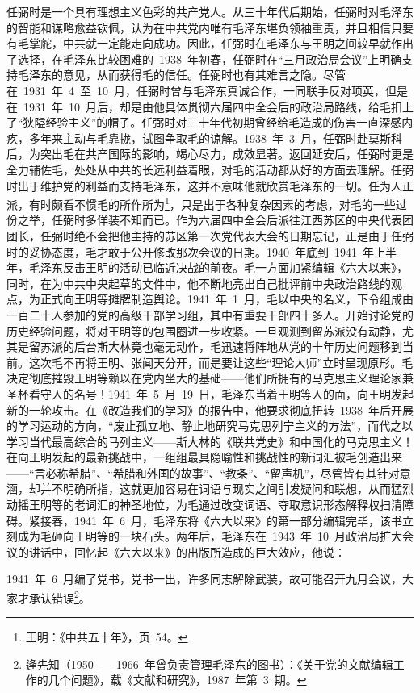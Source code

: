 任弼时是一个具有理想主义色彩的共产党人。从三十年代后期始，任弼时对毛泽东的智能和谋略愈益钦佩，认为在中共党内唯有毛泽东堪负领袖重责，并且相信只要有毛掌舵，中共就一定能走向成功。因此，任弼时在毛泽东与王明之间较早就作出了选择，在毛泽东比较困难的~1938~年初春，任弼时在“三月政治局会议”上明确支持毛泽东的意见，从而获得毛的信任。任弼时也有其难言之隐。尽管在~1931~年~4~至~10~月，任弼时曾与毛泽东真诚合作，一同联手反对项英，但是在~1931~年~10~月后，却是由他具体贯彻六届四中全会后的政治局路线，给毛扣上了“狭隘经验主义”的帽子。任弼时对三十年代初期曾经给毛造成的伤害一直深感内疚，多年来主动与毛靠拢，试图争取毛的谅解。1938~年~3~月，任弼时赴莫斯科后，为突出毛在共产国际的影响，竭心尽力，成效显著。返回延安后，任弼时更是全力辅佐毛，处处从中共的长远利益着眼，对毛的活动都从好的方面去理解。任弼时出于维护党的利益而支持毛泽东，这并不意味他就欣赏毛泽东的一切。任为人正派，有时颇看不惯毛的所作所为\footnote{王明：《中共五十年》，页~54。}，只是出于各种复杂因素的考虑，对毛的一些过份之举，任弼时多佯装不知而已。作为六届四中全会后派往江西苏区的中央代表团团长，任弼时绝不会把他主持的苏区第一次党代表大会的日期忘记，正是由于任弼时的妥协态度，毛才敢于公开修改那次会议的日期。1940~年底到~1941~年上半年，毛泽东反击王明的活动已临近决战的前夜。毛一方面加紧编辑《六大以来》，同时，在为中共中央起草的文件中，他不断地亮出自己批评前中央政治路线的观点，为正式向王明等摊牌制造舆论。1941~年~1~月，毛以中央的名义，下令组成由一百二十人参加的党的高级干部学习组，其中有重要干部四十多人。开始讨论党的历史经验问题，将对王明等的包围圈进一步收紧。一旦观测到留苏派没有动静，尤其是留苏派的后台斯大林竟也毫无动作，毛迅速将阵地从党的十年历史问题移到当前。这次毛不再将王明、张闻天分开，而是要让这些“理论大师”立时呈现原形。毛决定彻底摧毁王明等赖以在党内坐大的基础——他们所拥有的马克思主义理论家兼圣杯看守人的名号！1941~年~5~月~19~日，毛泽东当着王明等人的面，向王明发起新的一轮攻击。在《改造我们的学习》的报告中，他要求彻底扭转~1938~年后开展的学习运动的方向，“废止孤立地、静止地研究马克思列宁主义的方法”，而代之以学习当代最高综合的马列主义——斯大林的《联共党史》和中国化的马克思主义！在向王明发起的最新挑战中，一组组最具隐喻性和挑战性的新词汇被毛创造出来——“言必称希腊”、“希腊和外国的故事”、“教条”、“留声机”，尽管皆有其针对意涵，却并不明确所指，这就更加容易在词语与现实之间引发疑问和联想，从而猛烈动摇王明等的老词汇的神圣地位，为毛通过改变词语、夺取意识形态解释权扫清障碍。紧接春，1941~年~6~月，毛泽东将《六大以来》的第一部分编辑完毕，该书立刻成为毛砸向王明等的一块石头。两年后，毛泽东在~1943~年~10~月政治局扩大会议的讲话中，回忆起《六大以来》的出版所造成的巨大效应，他说：

\begin{quoting}
1941~年~6~月编了党书，党书一出，许多同志解除武装，故可能召开九月会议，大家才承认错误\footnote{逄先知（1950~—~1966~年曾负责管理毛泽东的图书）：《关于党的文献编辑工作的几个问题》，载《文献和研究》，1987~年第~3~期。}。
\end{quoting}


